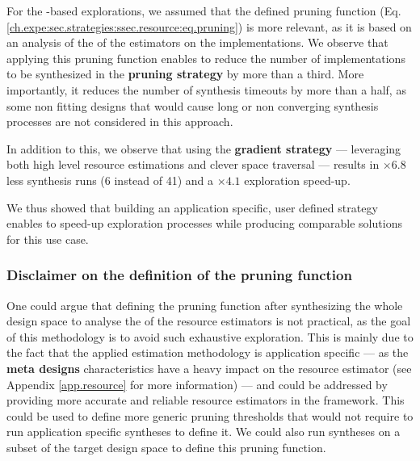                 For the -based explorations, we assumed that the defined pruning function (Eq. \ref{ch.expe:sec.strategies:ssec.resource:eq.pruning}) is more relevant, as it is based on an analysis of the  of the estimators on the  implementations.
                We observe that applying this pruning function enables to reduce the number of implementations to be synthesized in the {\bf pruning strategy} by more than a third.
                More importantly, it reduces the number of synthesis timeouts by more than a half, as some non fitting designs that would cause long or non converging synthesis processes are not considered in this approach.

                In addition to this, we observe that using the {\bf gradient strategy} --- \ie leveraging both high level resource estimations and clever space traversal --- results in $\times 6.8$ less synthesis runs (6 instead of 41) and a $\times 4.1$ exploration speed-up.

                We thus showed that building an application specific, user defined strategy enables to speed-up exploration processes while producing comparable solutions for this use case.

                \subsubsection{Disclaimer on the definition of the pruning function}
                    One could argue that defining the pruning function after synthesizing the whole design space to analyse the  of the resource estimators is not practical, as the goal of this methodology is to avoid such exhaustive exploration.
                    This is mainly due to the fact that the applied estimation methodology is application specific --- as the {\bf meta designs} characteristics have a heavy impact on the resource estimator  (see Appendix \ref{app.resource} for more information) --- and could be addressed by providing more accurate and reliable resource estimators in the framework.
                    This could be used to define more generic pruning thresholds that would not require to run application specific syntheses to define it.
                    We could also run syntheses on a subset of the target design space to define this pruning function.%

